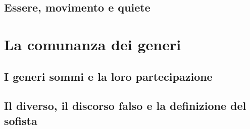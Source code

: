 \subsection{Essere, movimento e quiete}

\section{La comunanza dei generi}

\subsection{I generi sommi e la loro partecipazione}

\subsection{Il diverso, il discorso falso e la definizione del sofista}
